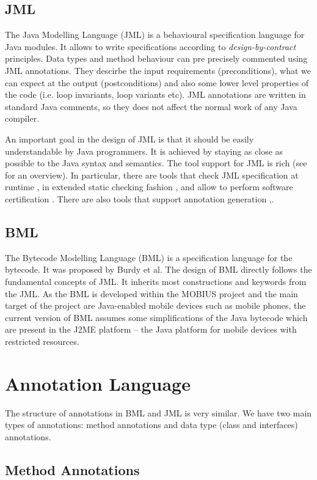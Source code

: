 \documentclass{acm_proc_article-sp}
\begin{document}
\subsection{JML}
The Java Modelling Language (JML) is a behavioural specification language for Java modules. It allows to write specifications according to \textit{design-by-contract} principles. Data types and method behaviour can pre precisely commented using JML annotations. They descirbe the input requirements (preconditions), what we can expect at the output (postconditions) and also some lower level properties of the code (i.e. loop invariants, loop variants etc). JML annotations are written in standard Java comments, so they does not affect the normal work of any Java compiler.

An important goal in the design of JML is that it should be easily understandable by Java programmers. It is achieved by staying as close as possible to the Java syntax and semantics. The tool support for JML is rich (see \cite{overviewOfJML} for an overview). In particular, there are tools that check JML specification at runtime \cite{runtime}, in extended static checking fashion \cite{escJava}, and allow to perform software certification \cite{krakatoa}. There are also tools that support annotation generation \cite{canapa},\cite{daikon}.
\subsection{BML}
The Bytecode Modelling Language (BML) is a specification language for the bytecode. It was proposed by Burdy et al. \cite{bmlBurdy} The design of BML directly follows the fundamental concepts of JML. It inherits most constructions and keywords from the JML. As the BML is developed within the MOBIUS \cite{mobius} project and the main target of the project are Java-enabled mobile devices such as mobile phones, the current version of BML assumes some simplifications of the Java bytecode which are present in the J2ME platform -- the Java platform for mobile devices with restricted resources.
\section{Annotation Language}
The structure of annotations in BML and JML is very similar. We have two main types of annotations: method annotations and data type (class and interfaces) annotations.
\subsection{Method Annotations}
\end{document}
